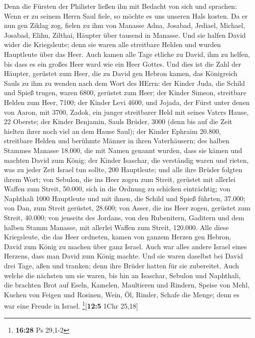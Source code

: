 Denn die Fürsten der Philister ließen ihn mit Bedacht von sich und
sprachen: Wenn er zu seinem Herrn Saul fiele, so möchte es uns unseren
Hals kosten.  Da er nun gen Ziklag zog, fielen zu ihm von
Manasse Adna, Josabad, Jediael, Michael, Josabad, Elihu, Zilthai,
Häupter über tausend in Manasse.  Und sie halfen David
wider die Kriegsleute; denn sie waren alle streitbare Helden und wurden
Hauptleute über das Heer.  Auch kamen alle Tage etliche
zu David, ihm zu helfen, bis dass es ein großes Heer ward wie ein Heer
Gottes.  Und dies ist die Zahl der Häupter, gerüstet zum
Heer, die zu David gen Hebron kamen, das Königreich Sauls zu ihm zu
wenden nach dem Wort des HErrn:  der Kinder Juda, die
Schild und Spieß trugen, waren 6800, gerüstet zum Heer; 
der Kinder Simeon, streitbare Helden zum Heer, 7100;  der
Kinder Levi 4600,  und Jojada, der Fürst unter denen von
Aaron, mit 3700,  Zadok, ein junger streitbarer Held mit
seines Vaters Hause, 22 Oberste;  der Kinder Benjamin,
Sauls Brüder, 3000 (denn bis auf die Zeit hielten ihrer noch viel an dem
Hause Saul);  der Kinder Ephraim 20.800, streitbare
Helden und berühmte Männer in ihren Vaterhäusern;  des
halben Stammes Manasse 18.000, die mit Namen genannt wurden, dass sie
kämen und machten David zum König;  der Kinder Isaschar,
die verständig waren und rieten, was zu jeder Zeit Israel tun sollte,
200 Hauptleute; und alle ihre Brüder folgten ihrem Wort; 
von Sebulon, die ins Heer zogen zum Streit, gerüstet mit allerlei Waffen
zum Streit, 50.000, sich in die Ordnung zu schicken einträchtig;
 von Naphthali 1000 Hauptleute und mit ihnen, die Schild
und Spieß führten, 37.000;  von Dan, zum Streit gerüstet,
28.600;  von Asser, die ins Heer zogen, gerüstet zum
Streit, 40.000;  von jenseits des Jordans, von den
Rubenitern, Gaditern und dem halben Stamm Manasse, mit allerlei Waffen
zum Streit, 120.000.  Alle diese Kriegsleute, die das
Heer ordneten, kamen von ganzem Herzen gen Hebron, David zum König zu
machen über ganz Israel. Auch war alles andere Israel eines Herzens,
dass man David zum König machte.  Und sie waren daselbst
bei David drei Tage, aßen und tranken; denn ihre Brüder hatten für sie
zubereitet.  Auch welche die nächsten um sie waren, bis
hin an Isaschar, Sebulon und Naphthali, die brachten Brot auf Eseln,
Kamelen, Maultieren und Rindern, Speise von Mehl, Kuchen von Feigen und
Rosinen, Wein, Öl, Rinder, Schafe die Menge; denn es war eine Freude in
Israel. \footnote{\textbf{16:28} Ps 29,1-2}{[}\textbf{12:5} 1Chr
25,18{]}

